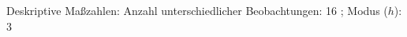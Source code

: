 				\label{tableValues:cjob09}
				\vspace*{-\baselineskip}
                    \begin{noten}
                	    \note{} Deskriptive Maßzahlen:
                	    Anzahl unterschiedlicher Beobachtungen: 16%
                	    ; 
                	      Modus ($h$): 3
                     \end{noten}

